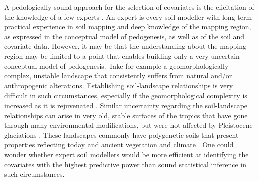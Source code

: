 A pedologically sound approach for the selection of covariates is the elicitation of the knowledge of a 
few experts \cite{LarkEtAl2007a, MeyerEtAl2001}. An expert is every soil modeller with long-term 
practical experience in soil mapping \cite{MeyerEtAl2001} and deep knowledge of the mapping 
region, as expressed in the conceptual model of pedogenesis, as well as of the soil and covariate data. 
However, it may be that the understanding about the mapping region may be limited to a point that enables
building only a very uncertain conceptual model of pedogenesis. Take for example a geomorphologically 
complex, unstable landscape that consistently suffers from natural and/or anthropogenic alterations. 
Establishing soil-landscape relationships is very difficult in such circumstances, especially if the 
geomorphological complexity is increased as it is rejuvenated \cite{StreckEtAl2008}. Similar uncertainty
regarding the soil-landscape relationships can arise in very old, stable surfaces of the tropics that have gone
through many environmental modifications, but were not affected by Pleistocene glaciations
\cite{MckenzieEtAl2006}. These landscapes commonly have polygenetic soils that present properties
reflecting today and ancient vegetation and climate \cite{PainEtAl1995, Ker1998}. One could wonder 
whether expert soil modellers would be more efficient at identifying the covariates with the highest 
predictive 
power than sound statistical inference in such circumstances.

